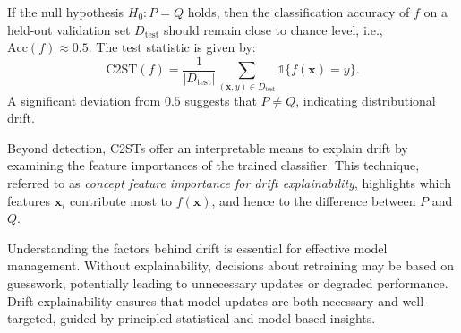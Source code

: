 If the null hypothesis $H_0: P = Q$ holds, then the classification accuracy of
$f$ on a held-out validation set $D_{\text{test}}$ should remain close to
chance level, i.e., $\text{Acc}(f) \approx 0.5$. The test statistic is given
by:
\begin{equation}
    \text{C2ST}(f) = \frac{1}{|D_{\text{test}}|} \sum_{(\mathbf{x}, y) \in D_{\text{test}}} \mathbb{1} \{f(\mathbf{x}) = y\}.
\end{equation}
A significant deviation from $0.5$ suggests that $P \neq Q$, indicating distributional drift.

Beyond detection, C2STs offer an interpretable means to explain drift by
examining the feature importances of the trained classifier. This technique,
referred to as \emph{concept feature importance for drift explainability},
highlights which features $\mathbf{x}_i$ contribute most to $f(\mathbf{x})$,
and hence to the difference between $P$ and $Q$.

Understanding the factors behind drift is essential for effective model
management. Without explainability, decisions about retraining may be based on
guesswork, potentially leading to unnecessary updates or degraded performance.
Drift explainability ensures that model updates are both necessary and
well-targeted, guided by principled statistical and model-based insights.